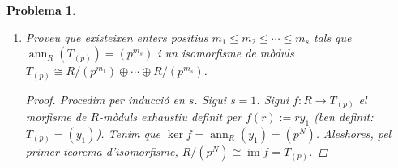 \documentclass[compress]{article}
\newtheorem{problema}{Problema}
\theoremstyle{definition}
\DeclareMathOperator{\im}{im}
\DeclareMathOperator{\ann}{ann}
\begin{document}
\begin{problema}
\begin{enumerate}
\begin{proof}
\begin{align*}
                &=p^{N}y\\
                &=0_{R}
                &\quad&\textrm{($y\in T_{(p)}$ i $\ann_{R}(T_{(p)})$)}
            \end{align*}
            Per tant, $p^{N-m}r\in\ann_{R}(y_{1})=(p^{N})$, d'on $\exists r'(r'\in R\land p^{N-m}r=r'p^{N})$. Ara,
            \begin{align*}
                p^{N-m}(r-r'p^{m})
                &=p^{N-m}r-r'p^{m}
                &\quad&\textrm{(Distributivitat)}\\
                &=0_{R}
                &\quad&\textrm{($p^{N-m}r=r'p^{m}$)}
            \end{align*}
            Com $R$ és domini i $p$ primer, $r-r'p^{m}=0_{R}$ (d'on $r=r'p^{m}$). Tenim que
            \begin{align*}
                p^{m}(y-r'y_{1})
                &=p^{m}y-(r'p^{m})y_{1}\\
                &=p^{m}y-ry_{1}
                &\quad&\textrm{($r'p^{m}=r$)}\\
                &=0_{R}
                &\quad&\textrm{($p^{m}y=ry_{1}$)}
            \end{align*}
            d'on $p^{m}\in\ann_{R}(y-r'y_{1})$ i, en conseqüència, $(p^{m})\subset\ann_{R}(y-r'y_{1})$. Per un argument similar que abans hem vist (quan veiem que $m\leq N$), deduïm que $\ann_{R}(y-r'y_{1})\subset\ann_{R}(\pi(y-r'y_{1}))$. Com $\pi(y-r'y_{1})=\pi(y)=y'$ i $\ann_{R}(y')=(p^{m})$, obtenim $\ann_{R}(y-r'y_{1})\subset(p^{m})$. Per doble inclusió, $\ann_{R}(y-r'y_{1})\subset(p^{m})$. $y-r'y_{1}$ és l'element que busquem.
        \end{proof}
        \item Proveu que existeixen enters positius $m_{1}\leq m_{2}\leq\cdots\leq m_{s}$ tals que $\ann_{R}(T_{(p)})=(p^{m_{s}})$ i un isomorfisme de mòduls $T_{(p)}\cong R/(p^{m_{1}})\oplus\cdots\oplus R/(p^{m_{s}})$.
        \begin{proof}
            Procedim per inducció en $s$.\newline
            Sigui $s=1$. Sigui $f:R\rightarrow T_{(p)}$ el morfisme de $R$-mòduls exhaustiu definit per $f(r):=ry_{1}$ (ben definit: $T_{(p)}=(y_{1})$). Tenim que $\ker{f}=\ann_{R}(y_{1})=(p^{N})$. Aleshores, pel primer teorema d'isomorfisme, $R/(p^{N})\cong\im{f}=T_{(p)}$.\newline

\end{proof}
\end{enumerate}
\end{problema}
\end{document}
